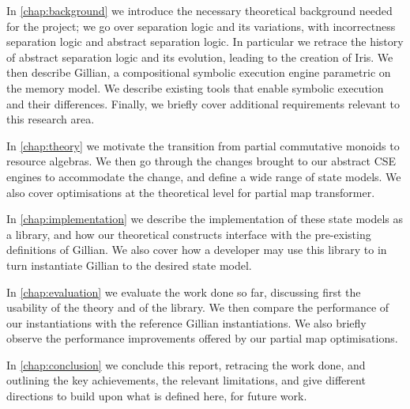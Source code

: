 In \autoref{chap:background} we introduce the necessary theoretical background needed for the project; we go over separation logic and its variations, with incorrectness separation logic and abstract separation logic. In particular we retrace the history of abstract separation logic and its evolution, leading to the creation of Iris. We then describe Gillian, a compositional symbolic execution engine parametric on the memory model. We describe existing tools that enable symbolic execution and their differences. Finally, we briefly cover additional requirements relevant to this research area.

In \autoref{chap:theory} we motivate the transition from partial commutative monoids to resource algebras. We then go through the changes brought to our abstract CSE engines to accommodate the change, and define a wide range of state models. We also cover optimisations at the theoretical level for partial map transformer.

In \autoref{chap:implementation} we describe the implementation of these state models as a library, and how our theoretical constructs interface with the pre-existing definitions of Gillian. We also cover how a developer may use this library to in turn instantiate Gillian to the desired state model.

In \autoref{chap:evaluation} we evaluate the work done so far, discussing first the usability of the theory and of the library. We then compare the performance of our instantiations with the reference Gillian instantiations. We also briefly observe the performance improvements offered by our partial map optimisations.

In \autoref{chap:conclusion} we conclude this report, retracing the work done, and outlining the key achievements, the relevant limitations, and give different directions to build upon what is defined here, for future work.
